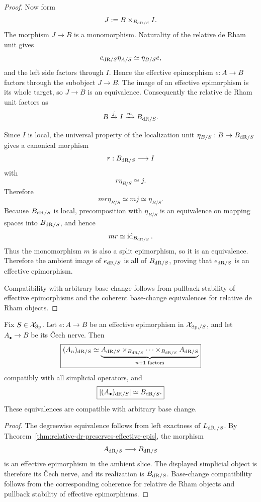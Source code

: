 \begin{proof}
Now form
\[
    J:=B\times_{B_{\mathrm{dR}/S}}I.
\]
The morphism \(J\to B\) is a monomorphism.  Naturality of the relative de Rham unit gives
\[
    e_{\mathrm{dR}/S}\eta_{A/S}\simeq\eta_{B/S}e,
\]
and the left side factors through \(I\).  Hence the effective epimorphism \(e:A\to B\) factors
through the subobject \(J\to B\).  The image of an effective epimorphism is its whole target, so
\(J\to B\) is an equivalence.  Consequently the relative de Rham unit factors as
\[
    B\xrightarrow{j}I\xrightarrow{m}B_{\mathrm{dR}/S}.
\]

Since \(I\) is local, the universal property of the localization unit
\(\eta_{B/S}:B\to B_{\mathrm{dR}/S}\) gives a canonical morphism
\[
    r:B_{\mathrm{dR}/S}\longrightarrow I
\]
with
\[
    r\eta_{B/S}\simeq j.
\]
Therefore
\[
    mr\eta_{B/S}
    \simeq
    mj
    \simeq
    \eta_{B/S}.
\]
Because \(B_{\mathrm{dR}/S}\) is local, precomposition with \(\eta_{B/S}\) is an equivalence on mapping
spaces into \(B_{\mathrm{dR}/S}\), and hence
\[
    mr\simeq\operatorname{id}_{B_{\mathrm{dR}/S}}.
\]
Thus the monomorphism \(m\) is also a split epimorphism, so it is an equivalence.  Therefore the
ambient image of \(e_{\mathrm{dR}/S}\) is all of \(B_{\mathrm{dR}/S}\), proving that \(e_{\mathrm{dR}/S}\) is an
effective epimorphism.

Compatibility with arbitrary base change follows from pullback stability of effective epimorphisms
and the coherent base-change equivalences for relative de Rham objects.
\end{proof}

\begin{corollary}
\label{cor:relative-dr-cech-effective-epi}
Fix \(S\in\mathcal X_{\mathrm{Sp}}\).  Let \(e:A\to B\) be an effective epimorphism in
\(\mathcal X_{\mathrm{Sp},/S}\), and let \(A_\bullet\to B\) be its \v{C}ech nerve.  Then
\[
\boxed{
    (A_n)_{\mathrm{dR}/S}
    \simeq
    \underbrace{
        A_{\mathrm{dR}/S}\times_{B_{\mathrm{dR}/S}}\cdots\times_{B_{\mathrm{dR}/S}}A_{\mathrm{dR}/S}
    }_{n+1\text{ factors}}
}
\]
compatibly with all simplicial operators, and
\[
\boxed{
    |(A_\bullet)_{\mathrm{dR}/S}|
    \simeq
    B_{\mathrm{dR}/S}.
}
\]
These equivalences are compatible with arbitrary base change.
\end{corollary}

\begin{proof}
The degreewise equivalence follows from left exactness of \(L_{\mathrm{dR},/S}\).  By
Theorem~\ref{thm:relative-dr-preserves-effective-epis}, the morphism
\[
    A_{\mathrm{dR}/S}\longrightarrow B_{\mathrm{dR}/S}
\]
is an effective epimorphism in the ambient slice.  The displayed simplicial object is therefore its
\v{C}ech nerve, and its realization is \(B_{\mathrm{dR}/S}\).  Base-change compatibility follows from the
corresponding coherence for relative de Rham objects and pullback stability of effective
epimorphisms.
\end{proof}

